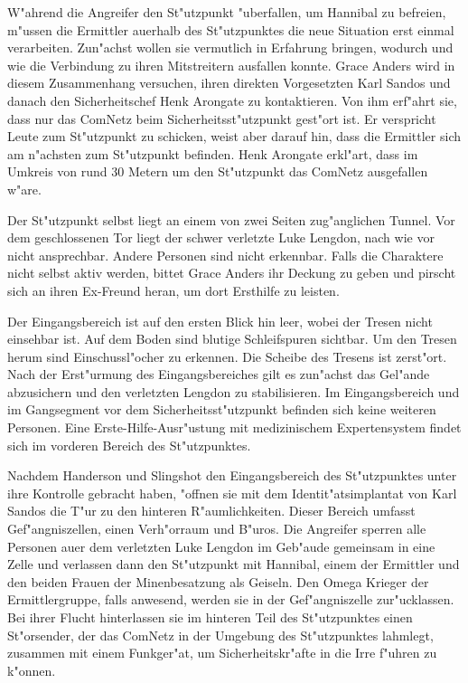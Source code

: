 W"ahrend die Angreifer den St"utzpunkt "uberfallen, um Hannibal zu befreien, m"ussen die Ermittler au\3erhalb des St"utzpunktes die neue Situation erst einmal verarbeiten. Zun"achst wollen sie vermutlich in Erfahrung bringen, wodurch und wie die Verbindung zu ihren Mitstreitern ausfallen konnte. Grace Anders wird in diesem Zusammenhang versuchen, ihren direkten Vorgesetzten Karl Sandos und danach den Sicherheitschef Henk Arongate zu kontaktieren. Von ihm erf"ahrt sie, dass nur das ComNetz beim Sicherheitsst"utzpunkt gest"ort ist. Er verspricht Leute zum St"utzpunkt zu schicken, weist aber darauf hin, dass die Ermittler sich am n"achsten zum St"utzpunkt befinden. Henk Arongate erkl"art, dass im Umkreis von rund 30 Metern um den St"utzpunkt das ComNetz ausgefallen w"are. 

Der St"utzpunkt selbst liegt an einem von zwei Seiten zug"anglichen Tunnel. Vor dem geschlossenen Tor liegt der schwer verletzte Luke Lengdon, nach wie vor nicht ansprechbar. Andere Personen sind nicht erkennbar. Falls die Charaktere nicht selbst aktiv werden, bittet Grace Anders ihr Deckung zu geben und pirscht sich an ihren Ex-Freund heran, um dort Ersthilfe zu leisten.

Der Eingangsbereich ist auf den ersten Blick hin leer, wobei der Tresen nicht einsehbar ist. Auf dem Boden sind blutige Schleifspuren  sichtbar. Um den Tresen herum sind Einschussl"ocher zu erkennen. Die Scheibe des Tresens ist zerst"ort. Nach der Erst"urmung des Eingangsbereiches gilt es zun"achst das Gel"ande abzusichern und den verletzten Lengdon zu stabilisieren. Im Eingangsbereich und im Gangsegment vor dem Sicherheitsst"utzpunkt befinden sich keine weiteren Personen. Eine Erste-Hilfe-Ausr"ustung mit medizinischem Expertensystem findet sich im vorderen Bereich des St"utzpunktes.

Nachdem Handerson und Slingshot den Eingangsbereich des St"utzpunktes unter ihre Kontrolle gebracht haben, "offnen sie mit dem Identit"atsimplantat von Karl Sandos die T"ur zu den hinteren R"aumlichkeiten. Dieser Bereich umfasst Gef"angniszellen, einen Verh"orraum und B"uros. Die Angreifer sperren alle Personen au\3er dem verletzten Luke Lengdon im Geb"aude gemeinsam in eine Zelle und verlassen dann den St"utzpunkt mit Hannibal, einem der Ermittler und den beiden Frauen der Minenbesatzung als Geiseln. Den Omega Krieger der Ermittlergruppe, falls anwesend, werden sie in der Gef"angniszelle zur"ucklassen. Bei ihrer Flucht hinterlassen sie im hinteren Teil des St"utzpunktes einen St"orsender, der das ComNetz in der Umgebung des St"utzpunktes lahmlegt, zusammen mit einem Funkger"at, um Sicherheitskr"afte in die Irre f"uhren zu k"onnen.

